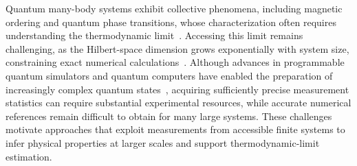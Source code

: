 \documentclass[pdflatex,sn-nature]{sn-jnl}%
\theoremstyle{thmstyleone}%
\theoremstyle{thmstyletwo}%
\theoremstyle{thmstylethree}%
\begin{document}

Quantum many-body systems exhibit collective phenomena, including magnetic ordering and quantum phase transitions, whose characterization often requires understanding the thermodynamic limit~\cite{tokura2017emergent,sachdev1999quantum}. Accessing this limit remains challenging, as the Hilbert-space dimension grows exponentially with system size, constraining exact numerical calculations~\cite{eisert2010colloquium}. Although advances in programmable quantum simulators and quantum computers have enabled the preparation of increasingly complex quantum states~\cite{bourgund2025formation,king2025beyond}, acquiring sufficiently precise measurement statistics can require substantial experimental resources, while accurate numerical references remain difficult to obtain for many large systems. These challenges motivate approaches that exploit measurements from accessible finite systems to infer physical properties at larger scales and support thermodynamic-limit estimation.

\end{document}
